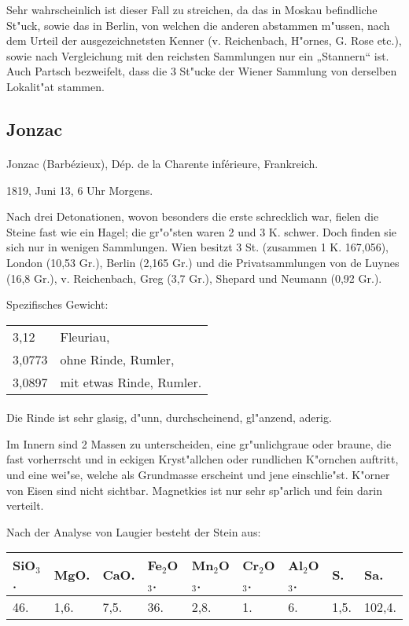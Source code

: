 \documentclass[a4paper, 11pt, oneside]{article}
\begin{document}
\normalsize
Sehr wahrscheinlich ist dieser Fall zu streichen, da das in Moskau befindliche St"uck, sowie das in Berlin, von welchen die anderen abstammen m"ussen, nach dem Urteil der ausgezeichnetsten Kenner (v. Reichenbach, H"ornes, G. Rose etc.), sowie nach Vergleichung mit den reichsten Sammlungen nur ein „Stannern“ ist. Auch Partsch bezweifelt, dass die 3 St"ucke der Wiener Sammlung von derselben Lokalit"at stammen.
\subsection{Jonzac}
\normalsize
\paragraph{}
Jonzac (Barbézieux), Dép. de la Charente inférieure, Frankreich.

1819, Juni 13, 6 Uhr Morgens.

Nach drei Detonationen, wovon besonders die erste schrecklich war, fielen die Steine fast wie ein Hagel; die gr"o"sten waren 2 und 3 K. schwer. Doch finden sie sich nur in wenigen Sammlungen. Wien besitzt 3 St. (zusammen 1 K. 167,056), London (10,53 Gr.), Berlin (2,165 Gr.) und die Privatsammlungen von de Luynes (16,8 Gr.), v. Reichenbach, Greg (3,7 Gr.), Shepard und Neumann (0,92 Gr.).

Spezifisches Gewicht:
\begin{table}[!ht]
    \centering
    \begin{tabular}{l l}
        3,12 & Fleuriau,\\
        3,0773 & ohne Rinde, Rumler,\\
        3,0897 & mit etwas Rinde, Rumler.
    \end{tabular}
\end{table}
\paragraph{}
Die Rinde ist sehr glasig, d"unn, durchscheinend, gl"anzend, aderig.

Im Innern sind 2 Massen zu unterscheiden, eine gr"unlichgraue oder braune, die fast vorherrscht und in eckigen Kryst"allchen oder rundlichen K"ornchen auftritt, und eine wei"se, welche als Grundmasse erscheint und jene einschlie"st. K"orner von Eisen sind nicht sichtbar. Magnetkies ist nur sehr sp"arlich und fein darin verteilt.

Nach der Analyse von Laugier besteht der Stein aus:
\begin{table}[!ht]
    \centering
    \footnotesize
    \begin{tabular}{l l l l l l l l l}
        SiO$_{3}$. & MgO. & CaO. & Fe$_{2}$O$_{3}$. & Mn$_{2}$O$_{3}$. & Cr$_{2}$O$_{3}$. & Al$_{2}$O$_{3}$. & S. & Sa. \\ \hline
        46. & 1,6. & 7,5. & 36. & 2,8. & 1. & 6. & 1,5. & 102,4. \\
    \end{tabular}
\end{table}
\end{document}

